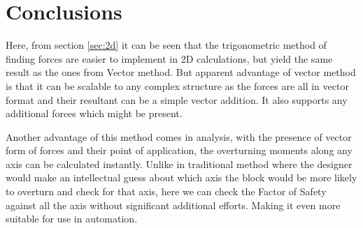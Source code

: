 
\section{Conclusions}
Here, from section \ref{sec:2d} it can be seen that the trigonometric method of finding forces are easier to implement in 2D calculations, but yield the same result as the ones from Vector method. But apparent advantage of vector method is that it can be scalable to any complex structure as the forces are all in vector format and their resultant can be a simple vector addition. It also supports any additional forces which might be present.

Another advantage of this method comes in analysis, with the presence of vector form of forces and their point of application, the overturning moments along any axis can be calculated instantly. Unlike in traditional method where the designer would make an intellectual guess about which axis the block would be more likely to overturn and check for that axis, here we can check the Factor of Safety against all the axis without significant additional efforts. Making it even more suitable for use in automation.  
